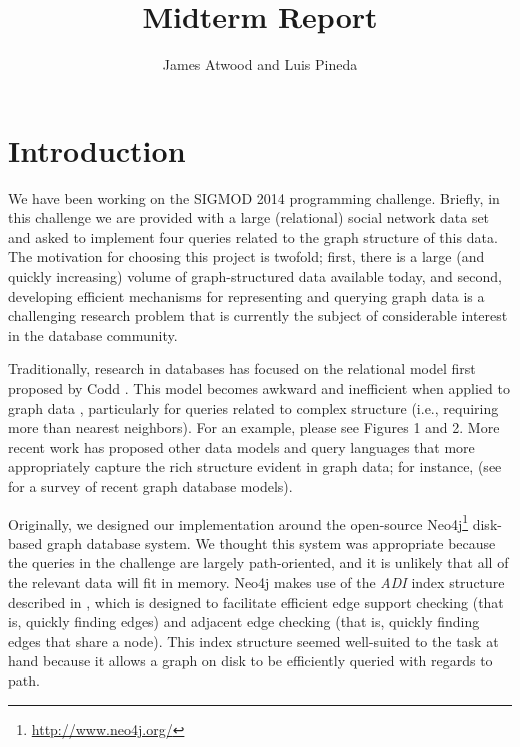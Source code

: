 \documentclass{article}
\title{Midterm Report}
\author{
James Atwood and Luis Pineda \\ %
}
\begin{document}
\maketitle

\section{Introduction}
We have been working on the SIGMOD 2014 programming challenge.  Briefly,
in this challenge we are provided with a large (relational) social
network data set and asked to implement four queries related to the
graph structure of this data.  The motivation for choosing this
project is twofold; first, there is a large (and quickly increasing)
volume of graph-structured data available today, and second,
developing efficient mechanisms for representing and querying graph
data is a challenging research problem that is currently the subject
of considerable interest in the database community.

Traditionally, research in databases has focused on the relational
model first proposed by Codd \cite{codd1970relational}.  This model
becomes awkward and inefficient when applied to graph data
\cite{rodriguez2011graph}, particularly for queries related to
complex structure (i.e., requiring more than nearest neighbors).  For
an example, please see \cite{he2008graphs} Figures 1 and 2.  More
recent work has proposed other data models and query languages that
more appropriately capture the rich structure evident in graph data;
for instance,
\cite{he2008graphs,sun2012efficient,low2010graphlab} (see
\cite{angles2008survey} for a survey of recent graph database
models).  


Originally, we designed our implementation around the open-source
Neo4j\footnote{\url{http://www.neo4j.org/}} disk-based graph database
system.  We thought this system was appropriate because the queries in
the challenge are largely path-oriented, and it is unlikely that all
of the relevant data will fit in memory.  Neo4j makes use of the
\emph{ADI} index structure \cite[Chapter~6]{IanRobinson:2013ul}
described in \cite{wang2004scalable}, which is designed to facilitate
efficient edge support checking (that is, quickly finding edges) and
adjacent edge checking (that is, quickly finding edges that share a
node).  This index structure seemed well-suited to the task at hand
because it allows a graph on disk to be efficiently queried with
regards to path.
\end{document}
